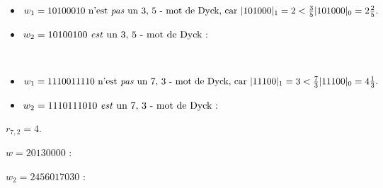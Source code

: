 \begin{example}[Définition 22 : $a < b : a = 3, b = 5$]
    ~
    \begin{itemize}
        \item $w_1 = 10100010 \text{ n'est \emph{pas} un 3, 5 - mot de
        Dyck, car } |101000|_1 = 2 < \frac{3}{5}|101000|_0 = 2 \frac{2}{5}.$
        \item $w_2 = 10100100 \text{ \emph{est} un 3, 5 - mot de Dyck : }$
    \end{itemize}
    
\end{example}

\begin{example}[Définition 22 : $a > b : a = 7, b = 3$]
    ~
    \begin{itemize}
        \item $w_1 = 1110011110 \text{ n'est \emph{pas} un 7, 3 - mot de
        Dyck, car } |11100|_1 = 3 < \frac{7}{3}|11100|_0 = 4 \frac{1}{3}.$
        \item $w_2 = 1110111010 \text{ \emph{est} un 7, 3 - mot de Dyck : }$
    \end{itemize}
    
\end{example}

\begin{example}[Théorème 23 : $a = 7, b = 2$]
    $r_{7,2} = 4$.
    \begin{center}
        
    \end{center}
\end{example}

\begin{example}[Définition 24 : $a < b : a = 3, b = 5$]
    $w = 20130000$ :\\
    
   \end{example}

\begin{example}[Définition 24 : $a > b : a = 7, b = 3$]
    $w_2 = 2456017030$ :\\
 
\end{example}

